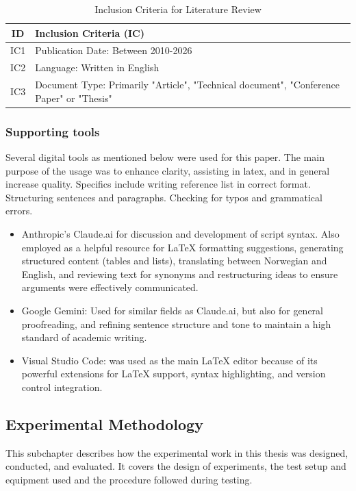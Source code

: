 \begin{table}[h]
    \centering
    \caption{Inclusion Criteria for Literature Review}\label{tab:inclusion_criteria}
    \begin{tabular}{|c|p{8cm}|}
        \hline
        ID & Inclusion Criteria (IC) \\
        \hline
        IC1 & Publication Date: Between 2010-2026 \\
        \hline
        IC2 & Language: Written in English \\
        \hline
        IC3 & Document Type: Primarily "Article", "Technical document", "Conference Paper" or "Thesis"\\
        \hline
    \end{tabular}
\end{table}


\subsubsection{Supporting tools}

Several digital tools as mentioned below were used for this paper. The main purpose of the usage was to enhance clarity, assisting in latex, and in general increase quality. Specifics include writing reference list in correct format. Structuring sentences and paragraphs. Checking for typos and grammatical errors.

\begin{itemize}
    \item Anthropic's Claude.ai for discussion and development of script syntax. Also employed as a helpful resource for LaTeX formatting suggestions, generating structured content (tables and lists), translating between Norwegian and English, and reviewing text for synonyms and restructuring ideas to ensure arguments were effectively communicated.
    \item Google Gemini: Used for similar fields as Claude.ai, but also for general proofreading, and refining sentence structure and tone to maintain a high standard of academic writing.
    \item Visual Studio Code: was used as the main LaTeX editor because of its powerful extensions for LaTeX support, syntax highlighting, and version control integration.
\end{itemize}


\subsection{Experimental Methodology}
This subchapter describes how the experimental work in this thesis was designed, conducted, and evaluated. It covers the design of experiments, the test setup and equipment used and the procedure followed during testing.


